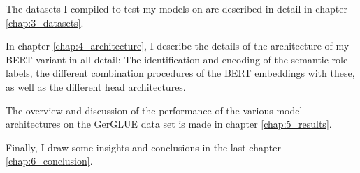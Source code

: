 The datasets I compiled to test my models on are described in detail
in chapter \ref{chap:3_datasets}.

In chapter \ref{chap:4_architecture}, I describe the details of the architecture of
my BERT-variant in all detail: The identification and encoding of the semantic role
labels, the different combination procedures of the BERT embeddings with these, as
well as the different head architectures.

The overview and discussion of the performance of the various model architectures on
the GerGLUE data set is made in chapter \ref{chap:5_results}.

Finally, I draw some insights and conclusions in the last chapter \ref{chap:6_conclusion}.

